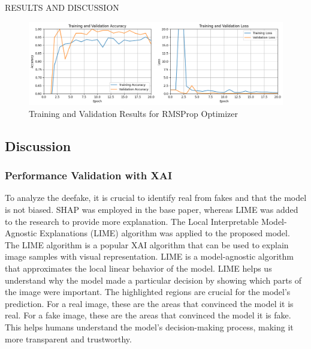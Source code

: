 \begin{section}[]{\uppercase{Results and Discussion}}
\begin{figure}[H]
    \centering
    \includegraphics[width=\linewidth]{images/result-2.png}
    \caption{Training and Validation Results for RMSProp Optimizer}
    \label{fig:result-2}
\end{figure}

\subsection{Discussion}
\subsubsection{Performance Validation with XAI}
To analyze the deefake, it is crucial to identify real from fakes and that the model is not biased. SHAP was employed in the base paper, whereas LIME was added to the research to provide more explanation.
The Local Interpretable Model-Agnostic Explanations (LIME) algorithm was applied to the proposed
model. The LIME algorithm is a popular XAI algorithm that can be used to explain image samples with
visual representation. LIME is a model-agnostic algorithm that approximates the local linear behavior of the model.
LIME helps us understand why the model made a particular decision by showing which parts of the image were important.
The highlighted regions are crucial for the model's prediction. For a real image, these are the areas that convinced the model it is real. For a fake image, these are the areas that convinced the model it is fake.
This helps humans understand the model's decision-making process, making it more transparent and trustworthy.


\end{section}
